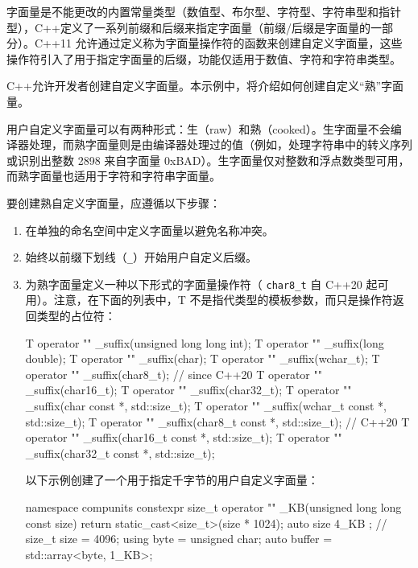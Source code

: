 

字面量是不能更改的内置常量类型（数值型、布尔型、字符型、字符串型和指针型），C++定义了一系列前缀和后缀来指定字面量（前缀/后缀是字面量的一部分）。C++11 允许通过定义称为字面量操作符的函数来创建自定义字面量，这些操作符引入了用于指定字面量的后缀，功能仅适用于数值、字符和字符串类型。

C++允许开发者创建自定义字面量。本示例中，将介绍如何创建自定义“熟”字面量。


用户自定义字面量可以有两种形式：生（raw）和熟（cooked）。生字面量不会编译器处理，而熟字面量则是由编译器处理过的值（例如，处理字符串中的转义序列或识别出整数 2898 来自字面量 0xBAD）。生字面量仅对整数和浮点数类型可用，而熟字面量也适用于字符和字符串字面量。


要创建熟自定义字面量，应遵循以下步骤：

\begin{enumerate}
\item
在单独的命名空间中定义字面量以避免名称冲突。

\item
始终以前缀下划线（\verb|_|）开始用户自定义后缀。

\item
为熟字面量定义一种以下形式的字面量操作符（ \verb|char8_t| 自 C++20 起可用）。注意，在下面的列表中，T 不是指代类型的模板参数，而只是操作符返回类型的占位符：

\begin{cpp}
T operator "" _suffix(unsigned long long int);
T operator "" _suffix(long double);
T operator "" _suffix(char);
T operator "" _suffix(wchar_t);
T operator "" _suffix(char8_t); // since C++20
T operator "" _suffix(char16_t);
T operator "" _suffix(char32_t);
T operator "" _suffix(char const *, std::size_t);
T operator "" _suffix(wchar_t const *, std::size_t);
T operator "" _suffix(char8_t const *, std::size_t); // C++20
T operator "" _suffix(char16_t const *, std::size_t);
T operator "" _suffix(char32_t const *, std::size_t);
\end{cpp}

以下示例创建了一个用于指定千字节的用户自定义字面量：

\begin{cpp}
namespace compunits
{
    constexpr size_t operator "" _KB(unsigned long long const size)
    {
        return static_cast<size_t>(size * 1024);
    }
}
auto size{ 4_KB };         // size_t size = 4096;
using byte = unsigned char;
auto buffer = std::array<byte, 1_KB>{};
\end{cpp}
\end{enumerate}

